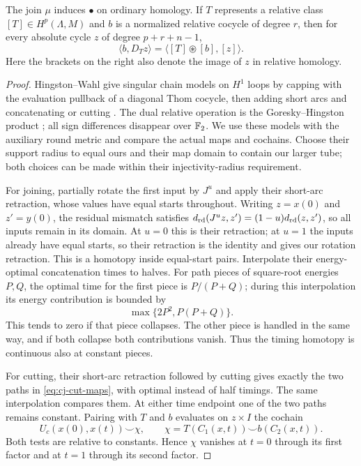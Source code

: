 \begin{lemma}
\label{lem:cj-public-comparison}
The join $\mu$ induces $\bullet$ on ordinary homology.
If $T$ represents a relative class $[T]\in H^p(\Lambda,M)$
and $b$ is a normalized relative cocycle of degree $r$, then
for every absolute cycle $z$ of degree $p+r+n-1$,
\begin{equation}\label{eq:cj-scalar-comparison}
 \langle b,D_Tz\rangle
   =\langle[T]\circledast[b],[z]\rangle.
\end{equation}
Here the brackets on the right also denote the image of $z$ in
relative homology.
\end{lemma}

\begin{proof}
Hingston--Wahl give singular chain models on $H^1$ loops by
capping with the evaluation pullback of a diagonal Thom cocycle,
then adding short arcs and concatenating or cutting
\cite[Theorem~A, Definitions~1.2 and~1.4]{HingstonWahl2023}.
The dual relative operation is the Goresky--Hingston product
\cite[Theorem~2.13]{HingstonWahl2023}; all sign differences
disappear over $\mathbb F_2$.  We use these models with the auxiliary
round metric and compare the actual maps and cochains.
Choose their support radius to equal ours and their map domain to
contain our larger tube; both choices can be made within their
injectivity-radius requirement.

For joining, partially rotate the first input by $J^u$ and
apply their short-arc retraction, whose values have equal starts
throughout.
Writing $z=x(0)$ and $z'=y(0)$, the residual mismatch satisfies
$d_{\rm rd}(J^u z,z')=(1-u)d_{\rm rd}(z,z')$,
so all inputs remain in its domain.
At $u=0$ this is their retraction; at $u=1$ the inputs already
have equal starts, so their retraction is the identity and gives
our rotation retraction.  This is a homotopy inside equal-start
pairs.  Interpolate their energy-optimal concatenation times to
halves.  For path pieces of square-root energies $P,Q$, the
optimal time for the first piece is $P/(P+Q)$; during this
interpolation its energy contribution is bounded by
\[
 \max\{2P^2,P(P+Q)\}.
\]
This tends to zero if that piece collapses.  The other piece is
handled in the same way, and if both collapse both contributions
vanish.  Thus the timing homotopy is continuous also at constant
pieces.

For cutting, their short-arc retraction followed by cutting gives
exactly the two paths in \eqref{eq:cj-cut-maps}, with optimal
instead of half timings.  The same interpolation compares them.
At either time endpoint one of the two paths remains constant.
Pairing with $T$ and $b$ evaluates on $z\times I$ the cochain
\[
 U_c(x(0),x(t))\smile\chi,\qquad
 \chi=T(C_1(x,t))\smile b(C_2(x,t)).
\]
Both tests are relative to constants.  Hence $\chi$ vanishes
at $t=0$ through its first factor and at $t=1$ through its
second factor.


\end{proof}
